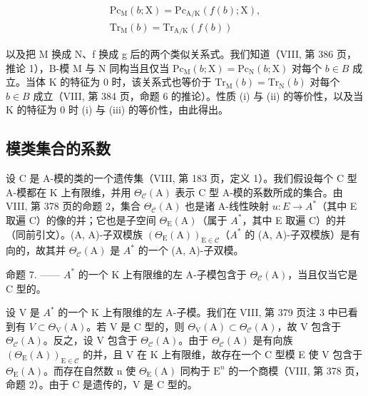 \[
\begin{array}{c} \mathrm {Pc_ {M}} (b; \mathrm{X}) = \mathrm {Pc_ {A / K}} (f (b); \mathrm{X}), \\ \mathrm{Tr} _ {\mathrm{M}} (b) = \mathrm{Tr} _ {\mathrm{A/K}} (f (b)) \end{array}
\]

以及把 M 换成 N、f 换成 g 后的两个类似关系式。我们知道（VIII, 第 386 页，推论 1），B-模 M 与 N 同构当且仅当 \(\mathrm{Pc}_{\mathrm{M}}(b;\mathrm{X})=\mathrm{Pc}_{\mathrm{N}}(b;\mathrm{X})\) 对每个 \(b\in B\) 成立。当体 K 的特征为 0 时，该关系式也等价于 \(\mathrm{Tr}_{\mathrm{M}}(b)=\mathrm{Tr}_{\mathrm{N}}(b)\) 对每个 \(b\in B\) 成立（VIII, 第 384 页，命题 6 的推论）。性质 (i) 与 (ii) 的等价性，以及当 K 的特征为 0 时 (i) 与 (iii) 的等价性，由此得出。

\subsection{模类集合的系数}

设 C 是 A-模的类的一个遗传集（VIII, 第 183 页，定义 1）。我们假设每个 C 型 A-模都在 K 上有限维，并用 \(\Theta_{\mathcal{C}}(\mathrm{A})\) 表示 C 型 A-模的系数所成的集合。由 VIII, 第 378 页的命题 2，集合 \(\Theta_{\mathcal{C}}(\mathrm{A})\) 也是诸 A-线性映射 \(u: E \to A^{*}\)（其中 E 取遍 C）的像的并；它也是子空间 \(\Theta_{\mathrm{E}}(\mathrm{A})\)（属于 \(A^{*}\)，其中 E 取遍 C）的并（同前引文）。(A, A)-子双模族 \((\Theta_{\mathrm{E}}(\mathrm{A}))_{\mathrm{E} \in \mathcal{C}}\)（\(A^{*}\) 的 (A, A)-子双模族）是有向的，故其并 \(\Theta_{\mathcal{C}}(\mathrm{A})\) 是 \(A^{*}\) 的一个 (A, A)-子双模。

命题 7. —— \(A^{*}\) 的一个 K 上有限维的左 A-子模包含于 \(\Theta_{\mathcal{C}}(\mathrm{A})\)，当且仅当它是 C 型的。

设 V 是 \(A^{*}\) 的一个 K 上有限维的左 A-子模。我们在 VIII, 第 379 页注 3 中已看到有 \(V \subset \Theta_{\mathrm{V}}(\mathrm{A})\)。若 V 是 C 型的，则 \(\Theta_{\mathrm{V}}(\mathrm{A}) \subset \Theta_{\mathcal{C}}(\mathrm{A})\)，故 V 包含于 \(\Theta_{\mathcal{C}}(\mathrm{A})\)。反之，设 V 包含于 \(\Theta_{\mathcal{C}}(\mathrm{A})\)。由于 \(\Theta_{\mathcal{C}}(\mathrm{A})\) 是有向族 \((\Theta_{\mathrm{E}}(\mathrm{A}))_{\mathrm{E}\in\mathcal{C}}\) 的并，且 V 在 K 上有限维，故存在一个 C 型模 E 使 V 包含于 \(\Theta_{\mathrm{E}}(\mathrm{A})\)。而存在自然数 n 使 \(\Theta_{\mathrm{E}}(\mathrm{A})\) 同构于 \(\mathrm{E}^{n}\) 的一个商模（VIII, 第 378 页，命题 2）。由于 C 是遗传的，V 是 C 型的。

